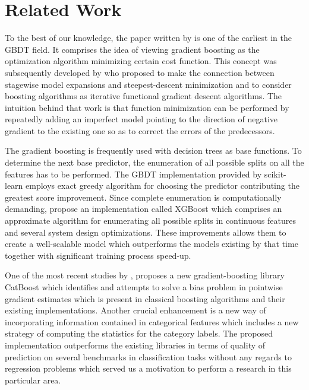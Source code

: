 \section{Related Work}
\label{sec:related-work}

To the best of our knowledge, the paper written by \citet{breiman1997arcing}  is one of the earliest in the GBDT field. It comprises the idea of viewing gradient boosting as the optimization algorithm minimizing certain cost function. This concept was subsequently developed by \citet{friedman2001greedy} who proposed to make the connection between stagewise model expansions and steepest-descent minimization and to consider boosting algorithms as iterative functional gradient descent algorithms. The intuition behind that work is that function minimization can be performed by repeatedly adding an imperfect model pointing to the direction of negative gradient to the existing one so as to correct the errors of the predecessors.

The gradient boosting is frequently used with decision trees as base functions. To determine the next base predictor, the enumeration of all possible splits on all the features has to be performed. The GBDT implementation provided by scikit-learn \cite{scikit-learn} employs exact greedy algorithm for choosing the predictor contributing the greatest score improvement. Since complete enumeration is computationally demanding, \citet{chen2016xgboost} propose an implementation called XGBoost which comprises an approximate algorithm for enumerating all possible splits in continuous features and several system design optimizations. These improvements allows them to create a well-scalable model which outperforms the models existing by that time together with significant training process speed-up.

One of the most recent studies by \citet{DBLP:journals/corr/DorogushGGKPV17}, \cite{dorogushcatboost} proposes a new gradient-boosting library CatBoost which identifies and attempts to solve a bias problem in pointwise gradient estimates which is present in classical boosting algorithms and their existing implementations. Another crucial enhancement is a new way of incorporating information contained in categorical features which includes a new strategy of computing the statistics for the category labels. The proposed implementation outperforms the existing libraries in terms of quality of prediction on several benchmarks in classification tasks without any regards to regression problems which served us a motivation to perform a research in this particular area.